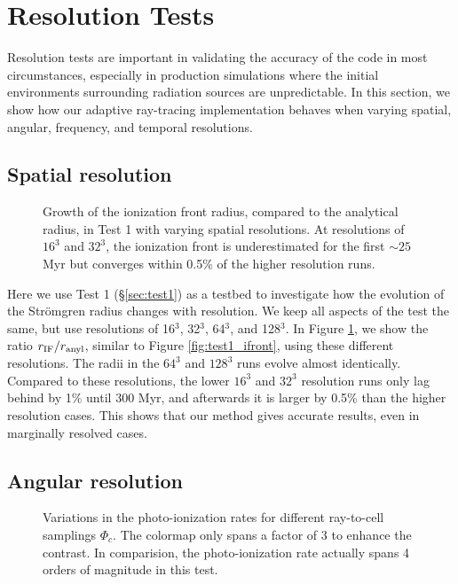 \documentclass[12pt,preprint]{aastex}
\begin{document}
\section{Resolution Tests}

Resolution tests are important in validating the accuracy of the code
in most circumstances, especially in production simulations where the
initial environments surrounding radiation sources are unpredictable.
In this section, we show how our adaptive ray-tracing implementation
behaves when varying spatial, angular, frequency, and temporal
resolutions.

\subsection{Spatial resolution}

\begin{figure}[t]
  \caption{\label{fig:dx_dep1} Growth of the ionization front radius,
    compared to the analytical radius, in Test 1 with varying spatial
    resolutions.  At resolutions of $16^3$ and $32^3$, the ionization
    front is underestimated for the first $\sim25$ Myr but converges
    within 0.5\% of the higher resolution runs.}
\end{figure}

Here we use Test 1 (\S\ref{sec:test1}) as a testbed to investigate how
the evolution of the Str\"{o}mgren radius changes with resolution.  We
keep all aspects of the test the same, but use resolutions of 16$^3$,
32$^3$, 64$^3$, and 128$^3$.  In Figure \ref{fig:dx_dep1}, we show the
ratio $r_{\rm IF}/r_{\rm anyl}$, similar to Figure
\ref{fig:test1_ifront}, using these different resolutions.  The radii
in the $64^3$ and $128^3$ runs evolve almost identically.  Compared to
these resolutions, the lower $16^3$ and $32^3$ resolution runs only
lag behind by 1\% until 300 Myr, and afterwards it is larger by 0.5\%
than the higher resolution cases.  This shows that our method gives
accurate results, even in marginally resolved cases.

\subsection{Angular resolution}
\label{sec:ang_dep}

\begin{figure}[t]
  \caption{\label{fig:ang_dep1} Variations in the photo-ionization
    rates for different ray-to-cell samplings $\Phi_c$.  The colormap
    only spans a factor of 3 to enhance the contrast.  In comparision,
    the photo-ionization rate actually spans 4 orders of magnitude in
    this test.}
\end{figure}
\end{document}
